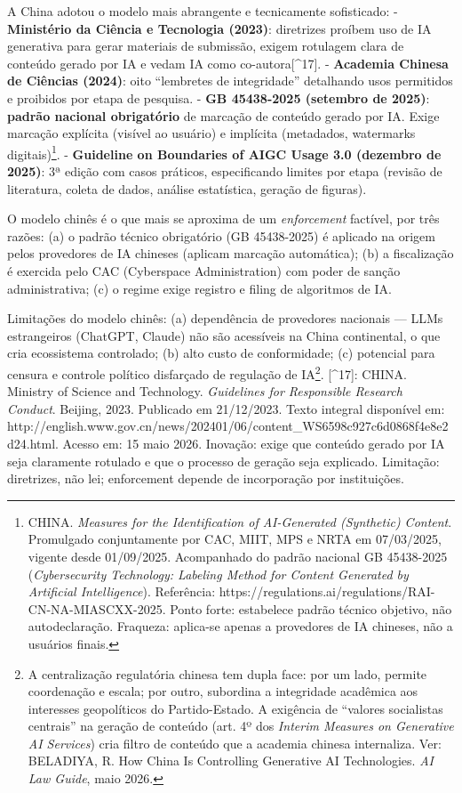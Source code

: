\documentclass[
  12pt,
  a4paper,
  brazil
]{article}
\begin{document}
A China adotou o modelo mais abrangente e tecnicamente sofisticado: -
\textbf{Ministério da Ciência e Tecnologia (2023)}: diretrizes proíbem
uso de IA generativa para gerar materiais de submissão, exigem rotulagem
clara de conteúdo gerado por IA e vedam IA como co-autora{[}\^{}17{]}. -
\textbf{Academia Chinesa de Ciências (2024)}: oito ``lembretes de
integridade'' detalhando usos permitidos e proibidos por etapa de
pesquisa. - \textbf{GB 45438-2025 (setembro de 2025)}: \textbf{padrão
nacional obrigatório} de marcação de conteúdo gerado por IA. Exige
marcação explícita (visível ao usuário) e implícita (metadados,
watermarks digitais)\footnote{CHINA. \emph{Measures for the
  Identification of AI-Generated (Synthetic) Content}. Promulgado
  conjuntamente por CAC, MIIT, MPS e NRTA em 07/03/2025, vigente desde
  01/09/2025. Acompanhado do padrão nacional GB 45438-2025
  (\emph{Cybersecurity Technology: Labeling Method for Content Generated
  by Artificial Intelligence}). Referência:
  https://regulations.ai/regulations/RAI-CN-NA-MIASCXX-2025. Ponto
  forte: estabelece padrão técnico objetivo, não autodeclaração.
  Fraqueza: aplica-se apenas a provedores de IA chineses, não a usuários
  finais.}. - \textbf{Guideline on Boundaries of AIGC Usage 3.0
(dezembro de 2025)}: 3ª edição com casos práticos, especificando limites
por etapa (revisão de literatura, coleta de dados, análise estatística,
geração de figuras).

O modelo chinês é o que mais se aproxima de um \emph{enforcement}
factível, por três razões: (a) o padrão técnico obrigatório (GB
45438-2025) é aplicado na origem pelos provedores de IA chineses
(aplicam marcação automática); (b) a fiscalização é exercida pelo CAC
(Cyberspace Administration) com poder de sanção administrativa; (c) o
regime exige registro e filing de algoritmos de IA.

Limitações do modelo chinês: (a) dependência de provedores nacionais ---
LLMs estrangeiros (ChatGPT, Claude) não são acessíveis na China
continental, o que cria ecossistema controlado; (b) alto custo de
conformidade; (c) potencial para censura e controle político disfarçado
de regulação de IA\footnote{A centralização regulatória chinesa tem
  dupla face: por um lado, permite coordenação e escala; por outro,
  subordina a integridade acadêmica aos interesses geopolíticos do
  Partido-Estado. A exigência de ``valores socialistas centrais'' na
  geração de conteúdo (art. 4º dos \emph{Interim Measures on Generative
  AI Services}) cria filtro de conteúdo que a academia chinesa
  internaliza. Ver: BELADIYA, R. How China Is Controlling Generative AI
  Technologies. \emph{AI Law Guide}, maio 2026.}. {[}\^{}17{]}: CHINA.
Ministry of Science and Technology. \emph{Guidelines for Responsible
Research Conduct}. Beijing, 2023. Publicado em 21/12/2023. Texto
integral disponível em:
http://english.www.gov.cn/news/202401/06/content\_WS6598c927c6d0868f4e8e2d24.html.
Acesso em: 15 maio 2026. Inovação: exige que conteúdo gerado por IA seja
claramente rotulado e que o processo de geração seja explicado.
Limitação: diretrizes, não lei; enforcement depende de incorporação por
instituições.
\end{document}
